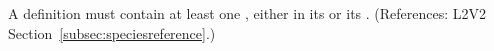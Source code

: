 A \Reaction definition must contain at least one \SpeciesReference, either
in its  or its .  (References:
L2V2 Section~\ref{subsec:speciesreference}.)
